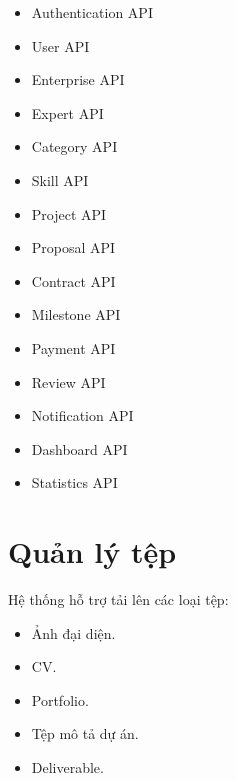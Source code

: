 \begin{itemize}

\item Authentication API

\item User API

\item Enterprise API

\item Expert API

\item Category API

\item Skill API

\item Project API

\item Proposal API

\item Contract API

\item Milestone API

\item Payment API

\item Review API

\item Notification API

\item Dashboard API

\item Statistics API

\end{itemize}


\section{Quản lý tệp}

Hệ thống hỗ trợ tải lên các loại tệp:

\begin{itemize}

\item Ảnh đại diện.

\item CV.

\item Portfolio.

\item Tệp mô tả dự án.

\item Deliverable.

\end{itemize}

